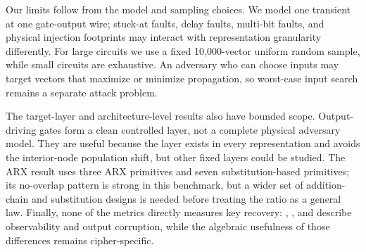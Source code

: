 Our limits follow from the model and sampling choices. We model one
transient \bitflip{} at one gate-output wire; stuck-at faults, delay
faults, multi-bit faults, and physical injection footprints may interact
with representation granularity differently. For large circuits we use a
fixed 10,000-vector uniform random sample, while small circuits are
exhaustive. An adversary who can choose inputs may target vectors that
maximize or minimize propagation, so worst-case input search remains a
separate attack problem.

The target-layer and architecture-level results also have bounded scope.
Output-driving gates form a clean controlled layer, not a complete
physical adversary model. They are useful because the layer exists in
every representation and avoids the interior-node population shift, but
other fixed layers could be studied. The ARX result uses three ARX
primitives and seven substitution-based primitives; its no-overlap
pattern is strong in this benchmark, but a wider set of addition-chain
and substitution designs is needed before treating the ratio as a
general law. Finally, none of the metrics directly measures key recovery:
\FCpct{}, \AvgDP{}, and \AvgBW{} describe observability and output
corruption, while the algebraic usefulness of those differences remains
cipher-specific.
